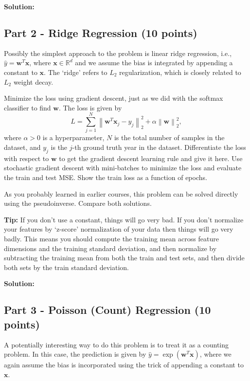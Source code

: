 \documentclass[11pt, oneside]{article}   	%
\begin{document}
\textbf{Solution:}\\


\subsection*{Part 2 - Ridge Regression (10 points)}
Possibly the simplest approach to the problem is linear ridge regression, i.e., $\hat{y} = \mathbf{w}^T\mathbf{x}$, where $\mathbf{x} \in \mathbb{R}^d$ and we assume the bias is integrated by appending a constant to $\mathbf{x}$. The `ridge' refers to $L_2$ regularization, which is closely related to  $L_2$ weight decay.  

 Minimize the loss using gradient descent, just as we did with the softmax classifier to find $\mathbf{w}$. The loss is given by
 \[L = \sum\limits_{j = 1}^N {\left\| {{{\mathbf{w}}^T}{{\mathbf{x}}_j} - {y_j}} \right\|_2^2}  + \alpha \left\| {\mathbf{w}} \right\|_2^2 , \]
where $\alpha > 0$ is a hyperparameter, $N$ is the total number of samples in the dataset, and $y_j$ is the $j$-th ground truth year in the dataset. Differentiate the loss with respect to $\mathbf{w}$ to get the gradient descent learning rule and give it here. Use stochastic gradient descent with mini-batches to minimize the loss and evaluate the train and test MSE. Show the train loss as a function of epochs.

 As you probably learned in earlier courses, this problem can be solved directly using the pseudoinverse. Compare both solutions.


\textbf{Tip:} If you don't use a constant, things will go very bad. If you don't normalize your features by `z-score' normalization of your data then things will go very badly. This means you should compute the training mean across feature dimensions and the training standard deviation, and then normalize by subtracting the training mean from both the train and test sets, and then divide both sets by the train standard deviation. 


\textbf{Solution:}\\





\subsection*{Part 3 - Poisson (Count) Regression (10 points)}
A potentially interesting way to do this problem is to treat it as a counting problem. In this case, the prediction is given by $\hat{y} = \exp \left( \mathbf{w}^T \mathbf{x} \right)$, where we again assume the bias is incorporated using the trick of appending a constant to $\mathbf{x}$. 
\end{document}
